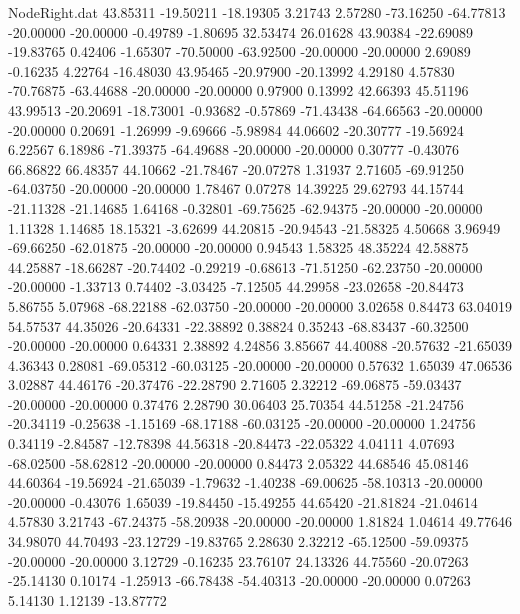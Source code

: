 \begin{filecontents}{NodeRight.dat}
  43.85311  -19.50211  -18.19305     3.21743    2.57280  -73.16250  -64.77813  -20.00000  -20.00000   -0.49789   -1.80695   32.53474   26.01628
  43.90384  -22.69089  -19.83765     0.42406   -1.65307  -70.50000  -63.92500  -20.00000  -20.00000    2.69089   -0.16235    4.22764  -16.48030
  43.95465  -20.97900  -20.13992     4.29180    4.57830  -70.76875  -63.44688  -20.00000  -20.00000    0.97900    0.13992   42.66393   45.51196
  43.99513  -20.20691  -18.73001    -0.93682   -0.57869  -71.43438  -64.66563  -20.00000  -20.00000    0.20691   -1.26999   -9.69666   -5.98984
  44.06602  -20.30777  -19.56924     6.22567    6.18986  -71.39375  -64.49688  -20.00000  -20.00000    0.30777   -0.43076   66.86822   66.48357
  44.10662  -21.78467  -20.07278     1.31937    2.71605  -69.91250  -64.03750  -20.00000  -20.00000    1.78467    0.07278   14.39225   29.62793
  44.15744  -21.11328  -21.14685     1.64168   -0.32801  -69.75625  -62.94375  -20.00000  -20.00000    1.11328    1.14685   18.15321   -3.62699
  44.20815  -20.94543  -21.58325     4.50668    3.96949  -69.66250  -62.01875  -20.00000  -20.00000    0.94543    1.58325   48.35224   42.58875
  44.25887  -18.66287  -20.74402    -0.29219   -0.68613  -71.51250  -62.23750  -20.00000  -20.00000   -1.33713    0.74402   -3.03425   -7.12505
  44.29958  -23.02658  -20.84473     5.86755    5.07968  -68.22188  -62.03750  -20.00000  -20.00000    3.02658    0.84473   63.04019   54.57537
  44.35026  -20.64331  -22.38892     0.38824    0.35243  -68.83437  -60.32500  -20.00000  -20.00000    0.64331    2.38892    4.24856    3.85667
  44.40088  -20.57632  -21.65039     4.36343    0.28081  -69.05312  -60.03125  -20.00000  -20.00000    0.57632    1.65039   47.06536    3.02887
  44.46176  -20.37476  -22.28790     2.71605    2.32212  -69.06875  -59.03437  -20.00000  -20.00000    0.37476    2.28790   30.06403   25.70354
  44.51258  -21.24756  -20.34119    -0.25638   -1.15169  -68.17188  -60.03125  -20.00000  -20.00000    1.24756    0.34119   -2.84587  -12.78398
  44.56318  -20.84473  -22.05322     4.04111    4.07693  -68.02500  -58.62812  -20.00000  -20.00000    0.84473    2.05322   44.68546   45.08146
  44.60364  -19.56924  -21.65039    -1.79632   -1.40238  -69.00625  -58.10313  -20.00000  -20.00000   -0.43076    1.65039  -19.84450  -15.49255
  44.65420  -21.81824  -21.04614     4.57830    3.21743  -67.24375  -58.20938  -20.00000  -20.00000    1.81824    1.04614   49.77646   34.98070
  44.70493  -23.12729  -19.83765     2.28630    2.32212  -65.12500  -59.09375  -20.00000  -20.00000    3.12729   -0.16235   23.76107   24.13326
  44.75560  -20.07263  -25.14130     0.10174   -1.25913  -66.78438  -54.40313  -20.00000  -20.00000    0.07263    5.14130    1.12139  -13.87772

\end{filecontents}
